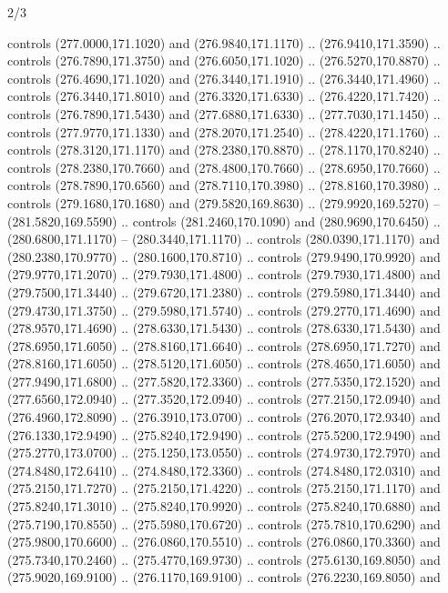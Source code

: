 \begin{flagdescription}{2/3}
\begin{scope}[xshift=0.5\flaglength,yshift=0.5\flagwidth,scale=\flagwidth/259.2]
\begin{scope}[y=0.8pt, x=0.8pt, yscale=-1,shift={(-243,-162)}]
      controls (277.0000,171.1020) and (276.9840,171.1170) .. (276.9410,171.3590) ..
      controls (276.7890,171.3750) and (276.6050,171.1020) .. (276.5270,170.8870) ..
      controls (276.4690,171.1020) and (276.3440,171.1910) .. (276.3440,171.4960) ..
      controls (276.3440,171.8010) and (276.3320,171.6330) .. (276.4220,171.7420) ..
      controls (276.7890,171.5430) and (277.6880,171.6330) .. (277.7030,171.1450) ..
      controls (277.9770,171.1330) and (278.2070,171.2540) .. (278.4220,171.1760) ..
      controls (278.3120,171.1170) and (278.2380,170.8870) .. (278.1170,170.8240) ..
      controls (278.2380,170.7660) and (278.4800,170.7660) .. (278.6950,170.7660) ..
      controls (278.7890,170.6560) and (278.7110,170.3980) .. (278.8160,170.3980) ..
      controls (279.1680,170.1680) and (279.5820,169.8630) .. (279.9920,169.5270) --
      (281.5820,169.5590) .. controls (281.2460,170.1090) and (280.9690,170.6450) ..
      (280.6800,171.1170) -- (280.3440,171.1170) .. controls (280.0390,171.1170) and
      (280.2380,170.9770) .. (280.1600,170.8710) .. controls (279.9490,170.9920) and
      (279.9770,171.2070) .. (279.7930,171.4800) .. controls (279.7930,171.4800) and
      (279.7500,171.3440) .. (279.6720,171.2380) .. controls (279.5980,171.3440) and
      (279.4730,171.3750) .. (279.5980,171.5740) .. controls (279.2770,171.4690) and
      (278.9570,171.4690) .. (278.6330,171.5430) .. controls (278.6330,171.5430) and
      (278.6950,171.6050) .. (278.8160,171.6640) .. controls (278.6950,171.7270) and
      (278.8160,171.6050) .. (278.5120,171.6050) .. controls (278.4650,171.6050) and
      (277.9490,171.6800) .. (277.5820,172.3360) .. controls (277.5350,172.1520) and
      (277.6560,172.0940) .. (277.3520,172.0940) .. controls (277.2150,172.0940) and
      (276.4960,172.8090) .. (276.3910,173.0700) .. controls (276.2070,172.9340) and
      (276.1330,172.9490) .. (275.8240,172.9490) .. controls (275.5200,172.9490) and
      (275.2770,173.0700) .. (275.1250,173.0550) .. controls (274.9730,172.7970) and
      (274.8480,172.6410) .. (274.8480,172.3360) .. controls (274.8480,172.0310) and
      (275.2150,171.7270) .. (275.2150,171.4220) .. controls (275.2150,171.1170) and
      (275.8240,171.3010) .. (275.8240,170.9920) .. controls (275.8240,170.6880) and
      (275.7190,170.8550) .. (275.5980,170.6720) .. controls (275.7810,170.6290) and
      (275.9800,170.6600) .. (276.0860,170.5510) .. controls (276.0860,170.3360) and
      (275.7340,170.2460) .. (275.4770,169.9730) .. controls (275.6130,169.8050) and
      (275.9020,169.9100) .. (276.1170,169.9100) .. controls (276.2230,169.8050) and

\end{scope}
\end{scope}
\end{flagdescription}
